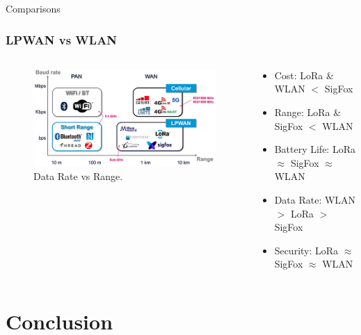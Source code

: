 \documentclass{beamer}
\begin{document}
\begin{frame}{Comparisons}
  \frametitle{LPWAN vs WLAN}
  \begin{columns}
    \begin{column}{0.5\textwidth}
      \begin{figure}[htbp]
        \centering
        \includegraphics[width=\textwidth]{NetworkRangeDataRateGraph.jpg}
        \caption{Data Rate vs Range.\cite{evanczukspeed}}
        \label{fig:Network_range_graph}
      \end{figure}
    \end{column}
    \begin{column}{0.5\textwidth}
      \begin{itemize}
        \item Cost: LoRa \& WLAN $<$ SigFox
        \item Range: LoRa \& SigFox $<$ WLAN
        \item Battery Life: LoRa $\approx$ SigFox $\approx$ WLAN
        \item Data Rate: WLAN $>$ LoRa $>$ SigFox
        \item Security: LoRa $\approx$ SigFox $\approx$ WLAN
      \end{itemize}
    \end{column}
  \end{columns}
\end{frame}

\section{Conclusion}
\end{document}
